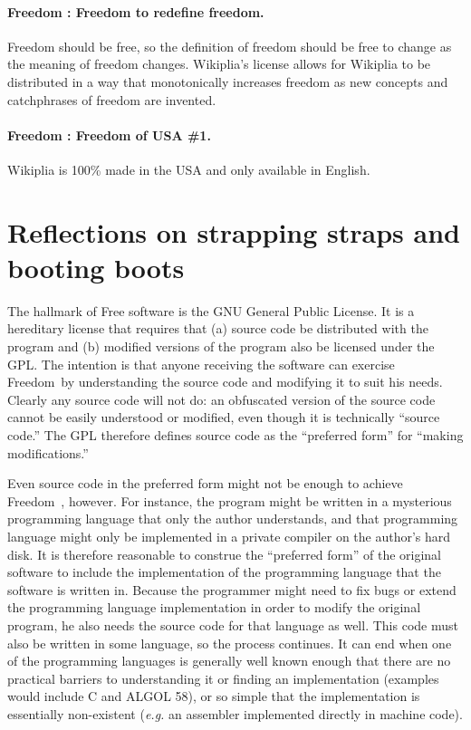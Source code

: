 \documentclass[twocolumn]{article}
\begin{document}
\paragraph{Freedom \ffree: Freedom to redefine freedom.}
Freedom should be free, so the definition of freedom should be free to
change as the meaning of freedom changes. Wikiplia's license allows
for Wikiplia to be distributed in a way that monotonically increases
freedom as new concepts and catchphrases of freedom are invented.

\paragraph{Freedom \fusa: Freedom of USA \#1.}
Wikiplia is 100\% made in the USA and only available in
English.\z{}


\section{Reflections on strapping straps and booting boots} \label{sec:bootstrap}

The hallmark of Free software is the GNU General Public License. It is
a hereditary license that requires that (a) source code be distributed
with the program and (b) modified versions of the program also be
licensed under the GPL. The intention is that anyone receiving the
software can exercise Freedom~\ftinker by understanding the source
code and modifying it to suit his needs. Clearly any source code will
not do: an obfuscated version of the source
code cannot be easily understood or modified, even though it is
technically ``source code.'' The GPL therefore defines source code as
the ``preferred form'' for ``making modifications.''

Even source code in the preferred form might not be enough to achieve
Freedom~\ftinker, however. For instance, the program might be written
in a mysterious programming language that only the author understands,
and that programming language might only be implemented in a private
compiler on the author's hard disk.\z{} It is therefore
reasonable to construe the ``preferred form'' of the original software
to include the implementation of the programming language that the
software is written in. Because the programmer might need to fix bugs
or extend the programming language implementation in order to modify
the original program, he also needs the source code for that language
as well. This code must also be written in some language, so the
process continues. It can end when one of the programming languages is
generally well known enough that there are no practical barriers to
understanding it or finding an implementation (examples would include
C and ALGOL 58), or so
simple that the implementation is essentially non-existent ({\em e.g.}
an assembler implemented directly in machine code).
\end{document}
